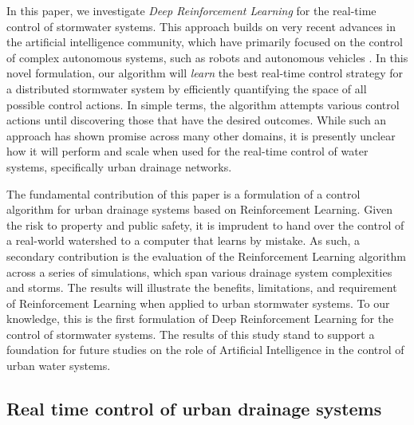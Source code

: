 In this paper, we investigate \textit{Deep Reinforcement Learning} for the real-time control of stormwater systems.
This approach builds on very recent advances in the artificial intelligence community, which have primarily focused on the control of complex autonomous systems, such as robots and autonomous vehicles \cite{Mnih2015,Lillicrap2015ContinuousLearning}.
In this novel formulation, our algorithm will \textit{learn} the best real-time control strategy for a distributed stormwater system by efficiently quantifying the space of all possible control actions.
In simple terms, the algorithm attempts various control actions until discovering those that have the desired outcomes.
While such an approach has shown promise across many other domains, it is presently unclear how it will perform and scale when used for the real-time control of water systems, specifically urban drainage networks.

The fundamental contribution of this paper is a formulation of a control algorithm for urban drainage systems based on Reinforcement Learning.
Given the risk to property and public safety, it is imprudent to hand over the control of a real-world watershed to a computer that learns by mistake.
As such, a secondary contribution is the evaluation of the Reinforcement Learning algorithm across a series of simulations, which span various drainage system complexities and storms.
The results will illustrate the benefits, limitations, and requirement of Reinforcement Learning when applied to urban stormwater systems.
To our knowledge, this is the first formulation of Deep Reinforcement Learning for the control of stormwater systems.
The results of this study stand to support a foundation for future studies on the role of Artificial Intelligence in the control of urban water systems.

\subsection{Real time control of urban drainage systems}


